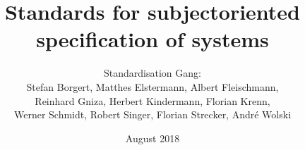 \documentclass[a4paper,12pt]{book}
\begin{document}
	
	\author{Standardisation Gang: \\ Stefan Borgert, Matthes Elstermann, Albert Fleischmann, \\ Reinhard Gniza, Herbert Kindermann, Florian Krenn,\\ Werner Schmidt, Robert Singer, Florian Strecker, André Wolski}
	\title{Standards for subjectoriented specification of systems}
	\date{August 2018}
	
	\frontmatter
	\maketitle
	\tableofcontents
	
	\mainmatter
	
	
	
	
	
	
\end{document}
